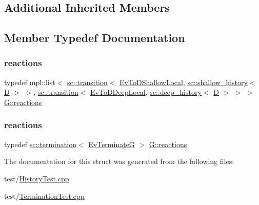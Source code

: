 \subsection*{Additional Inherited Members}


\subsection{Member Typedef Documentation}
\mbox{\label{struct_g_a27263c2aae05b19d5203310e40fb0520}} 
\subsubsection{\texorpdfstring{reactions}{reactions}\hspace{0.1cm}{\footnotesize\ttfamily [1/2]}}
{\footnotesize\ttfamily typedef mpl\+::list$<$ \mbox{\hyperlink{classboost_1_1statechart_1_1transition}{sc\+::transition}}$<$ \mbox{\hyperlink{struct_ev_to_d_shallow_local}{Ev\+To\+D\+Shallow\+Local}}, \mbox{\hyperlink{classboost_1_1statechart_1_1shallow__history}{sc\+::shallow\+\_\+history}}$<$ \mbox{\hyperlink{struct_d}{D}} $>$ $>$, \mbox{\hyperlink{classboost_1_1statechart_1_1transition}{sc\+::transition}}$<$ \mbox{\hyperlink{struct_ev_to_d_deep_local}{Ev\+To\+D\+Deep\+Local}}, \mbox{\hyperlink{classboost_1_1statechart_1_1deep__history}{sc\+::deep\+\_\+history}}$<$ \mbox{\hyperlink{struct_d}{D}} $>$ $>$ $>$ \mbox{\hyperlink{struct_g_a27263c2aae05b19d5203310e40fb0520}{G\+::reactions}}}

\mbox{\label{struct_g_a74380ed290a92cb7d62606d3ef31ce4d}} 
\subsubsection{\texorpdfstring{reactions}{reactions}\hspace{0.1cm}{\footnotesize\ttfamily [2/2]}}
{\footnotesize\ttfamily typedef \mbox{\hyperlink{classboost_1_1statechart_1_1termination}{sc\+::termination}}$<$ \mbox{\hyperlink{struct_ev_terminate_g}{Ev\+TerminateG}} $>$ \mbox{\hyperlink{struct_g_a27263c2aae05b19d5203310e40fb0520}{G\+::reactions}}}



The documentation for this struct was generated from the following files\+:\begin{DoxyCompactItemize}
\item 
test/\mbox{\hyperlink{_history_test_8cpp}{History\+Test.\+cpp}}\item 
test/\mbox{\hyperlink{_termination_test_8cpp}{Termination\+Test.\+cpp}}\end{DoxyCompactItemize}
